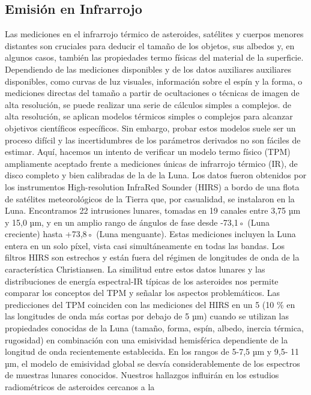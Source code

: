 \documentclass[12pt]{article}
\begin{document}
\subsection{Emisión en Infrarrojo}\label{sec:emision_IR}
Las mediciones en el infrarrojo térmico de asteroides, satélites y cuerpos menores distantes 
son cruciales para deducir el tamaño de los objetos, sus albedos
y, en algunos casos, también las propiedades termo físicas del material de la superficie. 
Dependiendo de las mediciones disponibles y de los datos auxiliares
auxiliares disponibles, como curvas de luz visuales, información sobre el espín y la forma, 
o mediciones directas del tamaño a partir de ocultaciones o técnicas de imagen de alta 
resolución, se puede realizar una serie de cálculos simples a complejos.
de alta resolución, se aplican modelos térmicos simples o complejos para alcanzar objetivos 
científicos específicos. Sin embargo, probar estos modelos
suele ser un proceso difícil y las incertidumbres de los parámetros derivados no son fáciles 
de estimar. Aquí, hacemos un intento de verificar un modelo termo físico (TPM) ampliamente 
aceptado frente a mediciones únicas de infrarrojo térmico (IR), de disco completo y bien 
calibradas de la de la Luna. Los datos fueron obtenidos por los instrumentos High-resolution 
InfraRed Sounder (HIRS) a bordo de una flota de satélites meteorológicos de la Tierra que, 
por casualidad, se instalaron en la Luna. Encontramos 22 intrusiones lunares, tomadas en 
19 canales entre 3,75 µm y 15,0 µm, y en un amplio rango de ángulos de fase desde -73,1◦ 
(Luna creciente) hasta +73,8◦ (Luna menguante). Estas mediciones incluyen la Luna entera 
en un solo píxel, vista casi simultáneamente en todas las bandas. Los filtros HIRS son 
estrechos y están fuera del régimen de longitudes de onda de la característica Christiansen. 
La similitud entre estos datos lunares y las distribuciones de energía espectral-IR típicas 
de los asteroides nos permite comparar los conceptos del TPM y señalar los aspectos 
problemáticos. Las predicciones del TPM coinciden con las mediciones del HIRS en un 5
(10 \% en las longitudes de onda más cortas por debajo de 5 µm) cuando se utilizan las 
propiedades conocidas de la Luna (tamaño, forma, espín, albedo, inercia térmica, rugosidad) 
en combinación con una emisividad hemisférica dependiente de la longitud de onda 
recientemente establecida. En los rangos de 5-7,5 µm y 9,5- 11 µm, el modelo de emisividad 
global se desvía considerablemente de los espectros de muestras lunares conocidos. 
Nuestros hallazgos influirán en los estudios radiométricos de asteroides cercanos a la 
\end{document}
